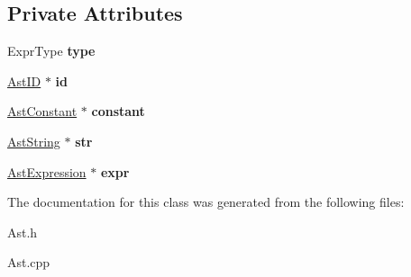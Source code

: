 \subsection*{Private Attributes}
\begin{DoxyCompactItemize}
\item 
\hypertarget{classAstPrimaryExpr_a591ec0d1a62cf2017702676cc3e71f72}{Expr\-Type {\bfseries type}}\label{classAstPrimaryExpr_a591ec0d1a62cf2017702676cc3e71f72}

\item 
\hypertarget{classAstPrimaryExpr_a3a235575b8df529c8ec9e6bb154835c8}{\hyperlink{classAstID}{Ast\-I\-D} $\ast$ {\bfseries id}}\label{classAstPrimaryExpr_a3a235575b8df529c8ec9e6bb154835c8}

\item 
\hypertarget{classAstPrimaryExpr_a1ccd7a8ee0a9180bf664b8b240645fff}{\hyperlink{classAstConstant}{Ast\-Constant} $\ast$ {\bfseries constant}}\label{classAstPrimaryExpr_a1ccd7a8ee0a9180bf664b8b240645fff}

\item 
\hypertarget{classAstPrimaryExpr_a945c94ecfbfd75803e8ae2181b0bedd7}{\hyperlink{classAstString}{Ast\-String} $\ast$ {\bfseries str}}\label{classAstPrimaryExpr_a945c94ecfbfd75803e8ae2181b0bedd7}

\item 
\hypertarget{classAstPrimaryExpr_ab846f737bc41dc09a00c820d4aa0dc27}{\hyperlink{classAstExpression}{Ast\-Expression} $\ast$ {\bfseries expr}}\label{classAstPrimaryExpr_ab846f737bc41dc09a00c820d4aa0dc27}

\end{DoxyCompactItemize}


The documentation for this class was generated from the following files\-:\begin{DoxyCompactItemize}
\item 
Ast.\-h\item 
Ast.\-cpp\end{DoxyCompactItemize}

